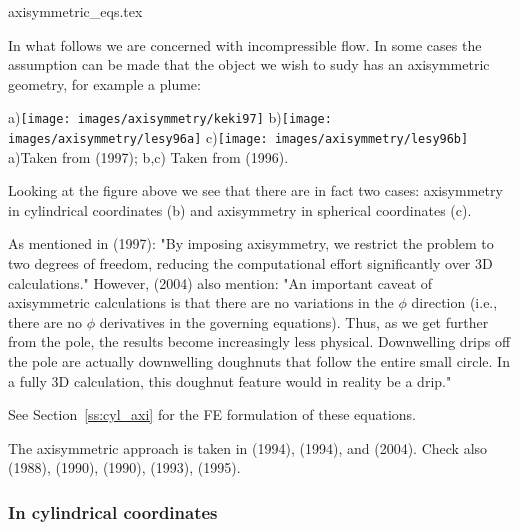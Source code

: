 \begin{flushright} {\tiny {\color{gray} axisymmetric\_eqs.tex}} \end{flushright}

In what follows we are concerned with incompressible flow.
In some cases the assumption can be made that the object we wish to sudy has an 
axisymmetric geometry, for example a plume:

\begin{center}
a)\texttt{[image: images/axisymmetry/keki97]}
b)\texttt{[image: images/axisymmetry/lesy96a]}
c)\texttt{[image: images/axisymmetry/lesy96b]}\\
{\captionfont a)Taken from \textcite{keki97} (1997); 
b,c) Taken from \textcite{lesy96} (1996).}
\end{center}

Looking at the figure above we see that there are in fact two cases: axisymmetry in 
cylindrical coordinates (b) and axisymmetry in spherical coordinates (c).

As mentioned in \textcite{keki97} (1997): "By imposing axisymmetry,
we restrict the problem to two degrees of freedom, reducing the computational
effort significantly over 3D calculations."
However, \textcite{reki04} (2004) also mention:
"An important caveat of axisymmetric calculations is that there are no variations 
in the $\phi$ direction (i.e., there are no $\phi$ derivatives in
the governing equations). Thus, as we get further from
the pole, the results become increasingly less physical.
Downwelling drips off the pole are actually downwelling
doughnuts that follow the entire small circle. In a fully
3D calculation, this doughnut feature would in reality be a drip."

See Section~\ref{ss:cyl_axi} for the FE formulation of these equations.

The axisymmetric approach is taken in 
\textcite{sope94} (1994), 
\textcite{sope94b} (1994), and 
\textcite{buja04} (2004).
Check also \textcite{thsq88} (1988), 
\textcite{thsq90} (1990),
\textcite{thsc90} (1990), 
\textcite{olsa93} (1993), 
\textcite{scag95} (1995). 

\subsubsection{In cylindrical coordinates}

